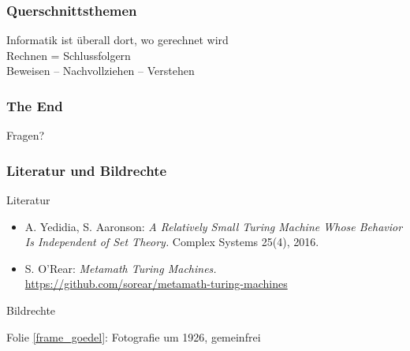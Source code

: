 \documentclass[aspectratio=1610,onlymath]{beamer}
\begin{document}
\begin{frame}\frametitle{Querschnittsthemen}

\begin{center}
\large

Informatik ist überall dort, wo gerechnet wird\pause\\[4ex]

Rechnen = Schlussfolgern\pause\\[4ex]

Beweisen -- Nachvollziehen -- Verstehen\pause\\[4ex]

\end{center}

\end{frame}


\begin{frame}\frametitle{The End}

\bigskip
\begin{center}
{\Huge Fragen?}
\end{center}
\bigskip\bigskip


\end{frame}


\begin{frame}[t]\frametitle{Literatur und Bildrechte}

\alert{Literatur}\bigskip

\begin{itemize}
\item A. Yedidia, S. Aaronson: \emph{A Relatively Small Turing Machine Whose Behavior Is Independent of Set Theory.} Complex Systems 25(4), 2016.
\item S. O'Rear: \emph{Metamath Turing Machines.} \url{https://github.com/sorear/metamath-turing-machines}
\end{itemize}

\alert{Bildrechte}\bigskip

Folie \ref{frame_goedel}: Fotografie um 1926, gemeinfrei

\end{frame}
\end{document}

